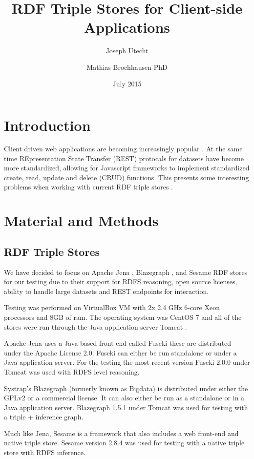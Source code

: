 \documentclass{llncs}
\title{RDF Triple Stores for Client-side Applications}
\author{Joseph Utecht \and Mathias Brochhausen PhD}
\institute{Department of Biomedical Informatics, University of Arkansas for Medical Sciences, Little Rock, AR}
\date{July 2015}
\begin{document}
\maketitle
\section{Introduction}

Client driven web applications are becoming increasingly popular \cite{Fielding2000}.  At the same time REpresentation State Transfer (REST) protocals for datasets have become more standardized, allowing for Javascript frameworks to implement standardized create, read, update and delete (CRUD) functions.  This presents some interesting problems when working with current RDF triple stores \cite{Battle2008}.

\section{Material and Methods}
\subsection{RDF Triple Stores}

We have decided to focus on Apache Jena \cite{Jena}, Blazegraph \cite{Blazegraph}, and Sesame \cite{Sesame} RDF stores for our testing due to their support for RDFS reasoning, open source licenses, ability to handle large datasets and REST endpoints for interaction. \cite{Voigt2012}

Testing was performed on VirtualBox VM \cite{Virtualbox} with 2x 2.4 GHz 6-core Xeon processors and 8GB of ram.  The operating system was CentOS 7 \cite{Centos} and all of the stores were run through the Java application server Tomcat \cite{Tomcat}.

Apache Jena uses a Java based front-end called Fuseki these are distributed under the Apache License 2.0.  Fuseki can either be run standalone or under a Java application server.  For the testing the most recent version Fuseki 2.0.0 under Tomcat was used with RDFS level reasoning.

Systrap's Blazegraph (formerly known as Bigdata) is distributed under either the GPLv2 or a commercial license.  It can also either be run as a standalone or in a Java application server.  Blazegraph 1.5.1 under Tomcat was used for testing with a triple + inference graph.

Much like Jena, Sesame is a framework that also includes a web front-end and native triple store.  Sesame version 2.8.4 was used for testing with a native triple store with RDFS inference.
\end{document}
